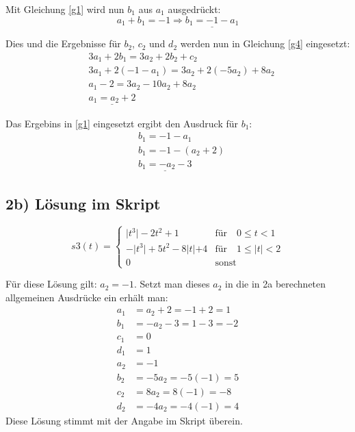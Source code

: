 \documentclass[a4paper,11pt,oneside]{scrartcl}
\begin{document}
Mit Gleichung \eqref{g1} wird nun $b_1$ aus $a_1$ ausgedrückt:
\begin{equation*}a_1 + b_1 = -1 \Rightarrow \underline{b_1 = -1 -a_1}\end{equation*}

Dies und die Ergebnisse für $b_2$, $c_2$ und $d_2$ werden nun in Gleichung \eqref{g4} eingesetzt:
\begin{align*}
&3a_1 + 2b_1 = 3a_2 + 2b_2 + c_2\\
&3a_1 + 2(-1 -a_1) = 3a_2 + 2(-5a_2) + 8a_2\\
&a_1 -2 = 3a_2 - 10a_2 + 8a_2\\
&\underline{a_1 = a_2 + 2}
\end{align*}

Das Ergebins in \eqref{g1} eingesetzt ergibt den Ausdruck für $b_1$:
\begin{align*}
&b_1 = -1 - a_1\\
&b_1 = -1 - (a_2 + 2)\\
&\underline{b_1 = -a_2 - 3}
\end{align*}

\subsection*{2b) Lösung im Skript}
\begin{equation*}
s3(t) = 
 \left\{ 
  \begin{array}{ll}
   \lvert t^3\rvert - 2t^2 + 1 & \text{für} \quad 0 \leq t < 1\\
   - \lvert t^3\rvert + 5t^2 -8\rvert t \lvert +4 & \text{für} \quad 1 \leq \rvert t \lvert < 2\\
   0 & \text{sonst}
  \end{array} 
 \right.
\end{equation*}

Für diese Lösung gilt: $a_2 = -1$. Setzt man dieses $a_2$ in die in 2a berechneten allgemeinen Ausdrücke ein erhält man:
\begin{align*}
a_1 &= a_2 + 2 = -1 + 2 = 1\\
b_1 &= -a_2 - 3 = 1 - 3 = -2\\
c_1 &= 0\\
d_1 &= 1\\
a_2 &= -1\\
b_2 &= -5a_2 = -5(-1) = 5\\
c_2 &= 8a_2 = 8(-1) = -8\\
d_2 &= -4a_2 = -4(-1) = 4
\end{align*}
Diese Lösung stimmt mit der Angabe im Skript überein.
\end{document}
